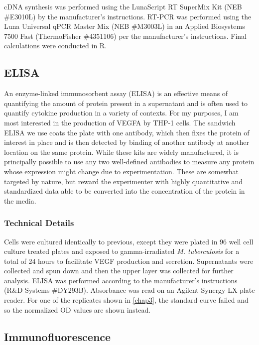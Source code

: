 cDNA synthesis was performed using the LunaScript RT SuperMix Kit (NEB \#E3010L) by the manufacturer's instructions. RT-PCR was performed using the Luna Universal qPCR Master Mix (NEB \#M3003L) in an Applied Biosystems 7500 Fast (ThermoFisher \#4351106) per the manufacturer's instructions. Final calculations were conducted in R. 

\subsection{ELISA}\label{elisa}

An enzyme-linked immunosorbent assay (ELISA) is an effective means of quantifying the amount of protein present in a supernatant and is often used to quantify cytokine production in a variety of contexts. For my purposes, I am most interested in the production of VEGFA by THP-1 cells. The sandwich ELISA we use coats the plate with one antibody, which then fixes the protein of interest in place and is then detected by binding of another antibody at another location on the same protein. While these kits are widely manufactured, it is principally possible to use any two well-defined antibodies to measure any protein whose expression might change due to experimentation. These are somewhat targeted by nature, but reward the experimenter with highly quantitative and standardized data able to be converted into the concentration of the protein in the media.

\subsubsection{Technical Details}\label{howelisa}

Cells were cultured identically to previous, except they were plated in 96 well cell culture treated plates and exposed to gamma-irradiated \textit{M. tuberculosis} for a total of 24 hours to facilitate VEGF production and secretion. Supernatants were collected and spun down and then the upper layer was collected for further analysis. ELISA was performed according to the manufacturer's instructions (R\&D Systems \#DY293B). Absorbance was read on an Agilent Synergy LX plate reader. For one of the replicates shown in \autoref{chap3}, the standard curve failed and so the normalized OD values are shown instead.

\subsection{Immunofluorescence}\label{immunofluorescence}

